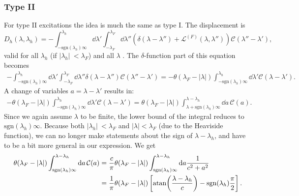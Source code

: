 \documentclass[11pt, a4paper,draft]{report} %
\newcommand{\inversetruncc}{\mathcal{L}}
\newcommand{\kernel}{\mathcal{C}}
\begin{document}
\subsubsection{Type II}
For type II excitations the idea is much the same as type I. The displacement is
\begin{equation}
	D_h(\lambda, \lambda_h) = - \int_{-\textrm{sgn}(\lambda_h)\infty}^{\lambda_h} \dd \lambda' \int_{-\lambda_F}^{\lambda_F} \dd \lambda'' \left(\delta(\lambda-\lambda'') + \inversetruncc^{(F)}(\lambda,\lambda'') \right)\kernel(\lambda''-\lambda'),
\end{equation}
valid for all \(\lambda_h\) (if \(\lvert \lambda_h \rvert\ < \lambda_F\)) and all \(\lambda\) \cite{tofind}.
The \(\delta\)-function part of this equation becomes
\begin{align}
	-\int_{-\textrm{sgn}(\lambda_h)\infty}^{\lambda_h} \dd \lambda' \int_{-\lambda_F}^{\lambda_F} \dd \lambda'' \delta(\lambda-\lambda'') \kernel(\lambda''-\lambda') 
		= - \theta(\lambda_F - \lvert \lambda \rvert) \int_{-\textrm{sgn}(\lambda_h)\infty}^{\lambda_h} \dd \lambda'     \kernel(\lambda-\lambda').
\end{align}
A change of variables \(a=\lambda-\lambda'\) results in:
\begin{align}
	 - \theta(\lambda_F - \lvert \lambda \rvert) \int_{-\textrm{sgn}(\lambda_h)\infty}^{\lambda_h} \dd \lambda'     \kernel(\lambda-\lambda') = 
	  \theta(\lambda_F - \lvert \lambda \rvert) \int_{\lambda+\textrm{sgn}(\lambda_h)\infty}^{\lambda-\lambda_h} \dd a \, \kernel(a).
\end{align}
Since we again assume \(\lambda\) to be finite, the lower bound of the integral reduces to \(\textrm{sgn}(\lambda_h)\infty\).
Because both \({\lvert \lambda_h \rvert\ < \lambda_F}\) and \({\lvert\lambda\rvert < \lambda_F}\) (due to the Heaviside function), we can no longer make statements about the sign of \(\lambda-\lambda_h\), and have to be a bit more general in our expression.
We get
\begin{align}
	  \theta(\lambda_F - \lvert \lambda \rvert) \int_{\textrm{sgn}(\lambda_h)\infty}^{\lambda-\lambda_h} \dd a \, \kernel(a) &=
	  \frac{c}{\pi}\theta(\lambda_F - \lvert \lambda \rvert) \int_{\textrm{sgn}(\lambda_h)\infty}^{\lambda-\lambda_h} \dd a \frac{1}{c^2 + a^2}\\
	  &= \frac{1}{\pi}\theta(\lambda_F - \lvert \lambda \rvert) \left[ \atan(\frac{\lambda-\lambda_h}{c}) - \textrm{sgn}(\lambda_h)\frac{\pi}{2}\right].
\end{align}
\end{document}
